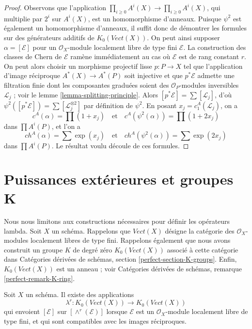 \begin{proof}
Observons que l'application $\prod_{i \geq 0} A^i(X) \to \prod_{i \geq 0} A^i(X)$,
qui multiplie par $2^i$ sur $A^i(X)$, est un homomorphisme d'anneaux. Puisque $\psi^2$
est également un homomorphisme d'anneaux, il suffit donc de démontrer les formules
sur des générateurs additifs de $K_0(\textit{Vect}(X))$. On peut ainsi supposer $\alpha = [\mathcal{E}]$
pour un $\mathcal{O}_X$-module localement libre de type fini $\mathcal{E}$.
La construction des classes de Chern de $\mathcal{E}$ ramène immédiatement
au cas où $\mathcal{E}$ est de rang constant $r$.
On peut alors choisir un morphisme projectif lisse $p : P \to X$
tel que l'application d'image réciproque $A^*(X) \to A^*(P)$ soit injective
et que $p^*\mathcal{E}$ admette une filtration finie dont
les composantes graduées soient des $\mathcal{O}_P$-modules inversibles $\mathcal{L}_j$ ; voir
le lemme \ref{lemma-splitting-principle}. Alors
$[p^*\mathcal{E}] = \sum [\mathcal{L}_j]$, d'où
$\psi^2([p^*\mathcal{E}]) = \sum [\mathcal{L}_j^{\otimes 2}]$
par définition de $\psi^2$. En posant $x_j  = c^A_1(\mathcal{L}_j)$,
on a
$$
c^A(\alpha) = \prod (1 + x_j)
\quad\text{et}\quad
c^A(\psi^2(\alpha)) = \prod (1 + 2 x_j)
$$
dans $\prod A^i(P)$, et l'on a
$$
ch^A(\alpha) = \sum \exp(x_j)
\quad\text{et}\quad
ch^A(\psi^2(\alpha)) = \sum \exp(2 x_j)
$$
dans $\prod A^i(P)$. Le résultat voulu découle de ces formules.
\end{proof}







\section{Puissances extérieures et groupes K}
\label{section-lambda-operations}

\noindent
Nous nous limitons aux constructions nécessaires pour définir les opérateurs lambda.
Soit $X$ un schéma. Rappelons que $\textit{Vect}(X)$ désigne
la catégorie des $\mathcal{O}_X$-modules localement libres de type fini.
Rappelons également que nous avons construit un groupe $K$ de degré zéro
$K_0(\textit{Vect}(X))$ associé à cette catégorie dans
Catégories dérivées de schémas, section \ref{perfect-section-K-groups}.
Enfin, $K_0(\textit{Vect}(X))$ est un anneau ; voir
Catégories dérivées de schémas, remarque \ref{perfect-remark-K-ring}.

\begin{lemma}
\label{lemma-lambda-operations}
Soit $X$ un schéma. Il existe des applications
$$
\lambda^r : K_0(\textit{Vect}(X)) \longrightarrow K_0(\textit{Vect}(X))
$$
qui envoient $[\mathcal{E}]$ sur $[\wedge^r(\mathcal{E})]$
lorsque $\mathcal{E}$ est un $\mathcal{O}_X$-module localement libre de type fini,
et qui sont compatibles avec les images réciproques.
\end{lemma}

